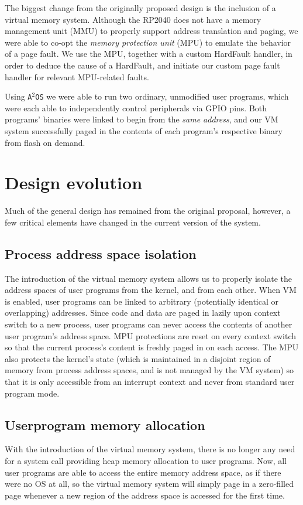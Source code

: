 \documentclass[12pt]{article}
\newcommand{\os}{\texttt{A$^2$OS} }
\begin{document}
The biggest change from the originally proposed design is the inclusion of a
virtual memory system. Although the RP2040 does not have a memory management
unit (MMU) to properly support address translation and paging, we were able
to co-opt the \emph{memory protection unit} (MPU) to emulate the behavior of a
page fault. We use the MPU, together with a custom HardFault handler, in order
to deduce the cause of a HardFault, and initiate our custom page fault handler
for relevant MPU-related faults.

Using \os we were able to run two ordinary, unmodified user programs, which were
each able to independently control peripherals via GPIO pins. Both programs'
binaries were linked to begin from the \emph{same address}, and our VM system
successfully paged in the contents of each program's respective binary from
flash on demand.


\section{Design evolution}
Much of the general design has remained from the original proposal, however, a
few critical elements have changed in the current version of the system.

\subsection{Process address space isolation}
The introduction of the virtual memory system allows us to properly isolate
the address spaces of user programs from the kernel, and from each other.
When VM is enabled, user programs can be linked to arbitrary (potentially
identical or overlapping) addresses. Since code and data are paged in lazily
upon context switch to a new process, user programs can never access the
contents of another user program's address space. MPU protections are reset on
every context switch so that the current process's content is freshly paged in
on each access. The MPU also protects the kernel's state (which is maintained in
a disjoint region of memory from process address spaces, and is not managed by
the VM system) so that it is only accessible from an interrupt context and never
from standard user program mode.

\subsection{Userprogram memory allocation}
With the introduction of the virtual memory system, there is no longer any need
for a system call providing heap memory allocation to user programs. Now, all
user programs are able to access the entire memory address space, as if there
were no OS at all, so the virtual memory system will simply page in a 
zero-filled page whenever a new region of the address space is accessed for the
first time.
\end{document}
